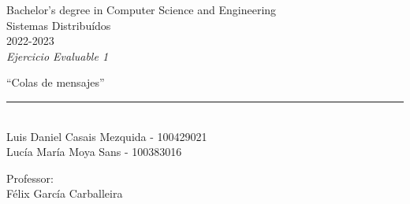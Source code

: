 \begin{titlepage}
    \begin{sffamily}
    \color{azulUC3M}
    \begin{center}
        \begin{figure}[H]
        \end{figure}
        \vspace{1.5cm}
        \begin{Large}
            Bachelor's degree in Computer Science and Engineering\\
            Sistemas Distribuídos\\
            2022-2023\\
            \vspace{2cm}
            \textsl{Ejercicio Evaluable 1}
            \bigskip

        \end{Large}
            {\Huge ``Colas de mensajes''}\\
            \vspace*{0.5cm}
            \rule{10.5cm}{0.1mm}\\
            \vspace*{0.9cm}
            {\LARGE Luis Daniel Casais Mezquida - 100429021}\\
            \vspace*{0.2cm}
            {\LARGE Lucía María Moya Sans - 100383016}\\
            \vspace*{0.2cm}

            \vspace*{0.8cm}
        \begin{Large}
            Professor:\\
            Félix García Carballeira\\
        \end{Large}
    \end{center}
    \vfill

    \end{sffamily}
\end{titlepage}
